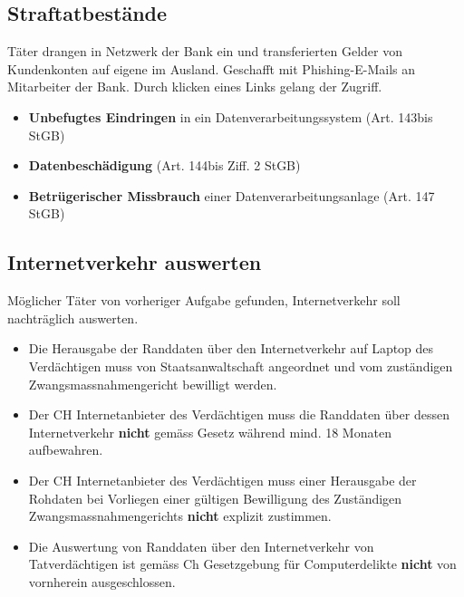 \subsection{Straftatbestände}
Täter drangen in Netzwerk der Bank ein und transferierten Gelder von Kundenkonten auf eigene im Ausland. Geschafft mit Phishing-E-Mails an Mitarbeiter der Bank. Durch klicken eines Links gelang der Zugriff.
\begin{itemize}
	\item \textbf{Unbefugtes Eindringen} in ein Datenverarbeitungssystem (Art. 143bis StGB)
	\item \textbf{Datenbeschädigung} (Art. 144bis Ziff. 2 StGB)
	\item \textbf{Betrügerischer Missbrauch} einer Datenverarbeitungsanlage (Art. 147 StGB)
\end{itemize}

\subsection{Internetverkehr auswerten}
Möglicher Täter von vorheriger Aufgabe gefunden, Internetverkehr soll nachträglich auswerten.
\begin{itemize}
	\item Die Herausgabe der Randdaten über den Internetverkehr auf Laptop des Verdächtigen muss von Staatsanwaltschaft angeordnet und vom zuständigen Zwangsmassnahmengericht bewilligt werden.
	\item Der CH Internetanbieter des Verdächtigen muss die Randdaten über dessen Internetverkehr \textbf{nicht} gemäss Gesetz während mind. 18 Monaten aufbewahren.
	\item Der CH Internetanbieter des Verdächtigen muss einer Herausgabe der Rohdaten bei Vorliegen einer gültigen Bewilligung des Zuständigen Zwangsmassnahmengerichts \textbf{nicht} explizit zustimmen.
	\item Die Auswertung von Randdaten über den Internetverkehr von Tatverdächtigen ist gemäss Ch Gesetzgebung für Computerdelikte \textbf{nicht} von vornherein ausgeschlossen.
\end{itemize}
